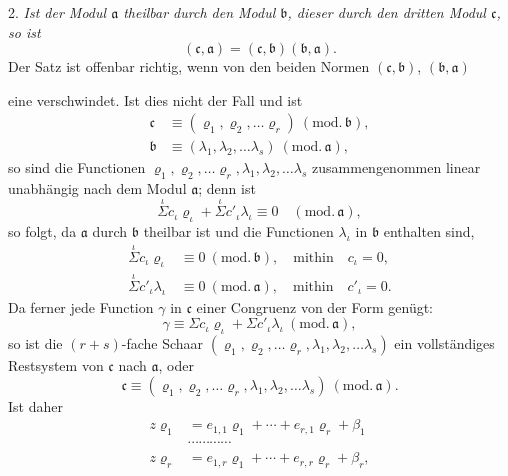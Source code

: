 \documentclass{article}
\begin{document}
2. \emph{Ist der Modul $\mathfrak{a}$ theilbar durch den Modul $\mathfrak{b}$, dieser durch den dritten Modul $\mathfrak{c}$, so ist}
\[ (\mathfrak{c}, \mathfrak{a}) = (\mathfrak{c}, \mathfrak{b})(\mathfrak{b}, \mathfrak{a}). \]
Der Satz ist offenbar richtig, wenn von den beiden Normen $(\mathfrak{c}, \mathfrak{b})$, $(\mathfrak{b}, \mathfrak{a})$

eine verschwindet. Ist dies nicht der Fall und ist
\[ \begin{aligned} \mathfrak{c} &\equiv (\varrho_{1}, \varrho_{2}, \ldots \varrho_{r}) \ (\text{mod.}\,\mathfrak{b}), \\ \mathfrak{b} &\equiv (\lambda_{1}, \lambda_{2}, \ldots \lambda_{s}) \ (\text{mod.}\,\mathfrak{a}), \end{aligned} \]
so sind die Functionen $\varrho_{1}, \varrho_{2}, \ldots \varrho_{r}, \lambda_{1}, \lambda_{2}, \ldots \lambda_{s}$ zusammengenommen linear unabhängig nach dem Modul $\mathfrak{a}$; denn ist
\[ \overset{\iota}{\Sigma} c_{\iota}\varrho_{\iota} + \overset{\iota}{\Sigma} c'_{\iota}\lambda_{\iota} \equiv 0 \quad (\text{mod.}\,\mathfrak{a}), \]
so folgt, da $\mathfrak{a}$ durch $\mathfrak{b}$ theilbar ist und die Functionen $\lambda_{\iota}$ in $\mathfrak{b}$ enthalten sind,
\[ \begin{aligned} \overset{\iota}{\Sigma} c_{\iota}\varrho_{\iota} &\equiv 0 \ (\text{mod.}\,\mathfrak{b}), \quad \text{mithin} \quad c_{\iota} = 0, \\ \overset{\iota}{\Sigma} c'_{\iota}\lambda_{\iota} &\equiv 0 \ (\text{mod.}\,\mathfrak{a}), \quad \text{mithin} \quad c'_{\iota} = 0. \end{aligned} \]
Da ferner jede Function $\gamma$ in $\mathfrak{c}$ einer Congruenz von der Form genügt:
\[ \gamma \equiv \Sigma c_{\iota}\varrho_{\iota} + \Sigma c'_{\iota}\lambda_{\iota} \ (\text{mod.}\,\mathfrak{a}), \]
so ist die $(r+s)$-fache Schaar $(\varrho_{1}, \varrho_{2}, \ldots \varrho_{r}, \lambda_{1}, \lambda_{2}, \ldots \lambda_{s})$ ein vollständiges Restsystem von $\mathfrak{c}$ nach $\mathfrak{a}$, oder
\[ \mathfrak{c} \equiv (\varrho_{1}, \varrho_{2}, \ldots \varrho_{r}, \lambda_{1}, \lambda_{2}, \ldots \lambda_{s}) \ (\text{mod.}\,\mathfrak{a}). \]
Ist daher
\[ \begin{aligned} z\varrho_{1} &= e_{1,1}\varrho_{1} + \cdots + e_{r,1}\varrho_{r} + \beta_{1} \\ &\cdots\cdots\cdots\cdots \\ z\varrho_{r} &= e_{1,r}\varrho_{1} + \cdots + e_{r,r}\varrho_{r} + \beta_{r}, \end{aligned} \]
\end{document}

